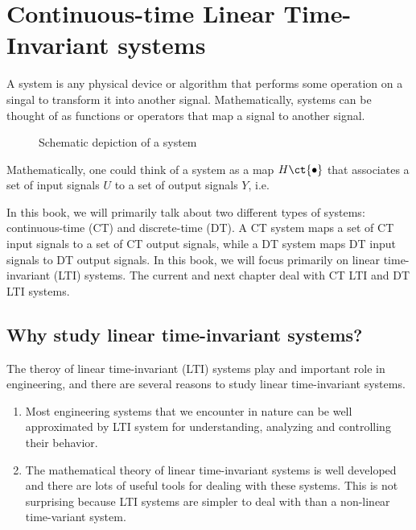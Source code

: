 
\chapter{Continuous-time Linear Time-Invariant systems}


A system is any physical device or algorithm that performs some operation on a singal to transform it into another signal. Mathematically, systems can be thought of as functions or operators that map a signal to another signal. 

\begin{figure}[h]
\centering
\caption{Schematic depiction of a system} \label{fig:ch1_system}
\end{figure}

Mathematically, one could think of a system as a map $H\ct{\bullet}$ that associates a set of input signals $U$ to a set of output signals $Y$, i.e.

In this book, we will primarily talk about two different types of systems: continuous-time (CT) and discrete-time (DT). A CT system maps a set of CT input signals to a set of CT output signals, while a DT system maps DT input signals to DT output signals. In this book, we will focus primarily on linear time-invariant (LTI) systems. The current and next chapter deal with CT LTI  and DT LTI systems. 

\section{Why study linear time-invariant systems?}
The theroy of linear time-invariant (LTI) systems play and important role in engineering, and there are several reasons to study linear time-invariant systems.
\begin{enumerate}
    \item Most engineering systems that we encounter in nature can be well approximated by LTI system for understanding, analyzing and controlling their behavior. 
    \item The mathematical theory of linear time-invariant systems is well developed and there are lots of useful tools for dealing with these systems. This is not surprising because LTI systems are simpler to deal with than a non-linear time-variant system. 
\end{enumerate}

